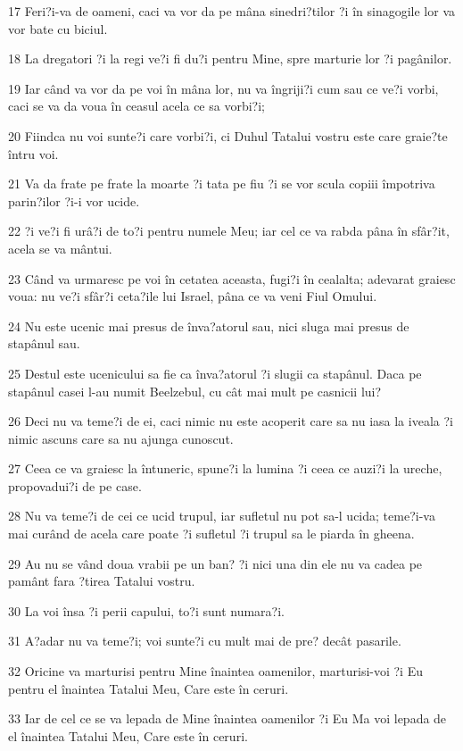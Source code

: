 \par 17 Feri?i-va de oameni, caci va vor da pe mâna sinedri?tilor ?i în sinagogile lor va vor bate cu biciul.
\par 18 La dregatori ?i la regi ve?i fi du?i pentru Mine, spre marturie lor ?i pagânilor.
\par 19 Iar când va vor da pe voi în mâna lor, nu va îngriji?i cum sau ce ve?i vorbi, caci se va da voua în ceasul acela ce sa vorbi?i;
\par 20 Fiindca nu voi sunte?i care vorbi?i, ci Duhul Tatalui vostru este care graie?te întru voi.
\par 21 Va da frate pe frate la moarte ?i tata pe fiu ?i se vor scula copiii împotriva parin?ilor ?i-i vor ucide.
\par 22 ?i ve?i fi urâ?i de to?i pentru numele Meu; iar cel ce va rabda pâna în sfâr?it, acela se va mântui.
\par 23 Când va urmaresc pe voi în cetatea aceasta, fugi?i în cealalta; adevarat graiesc voua: nu ve?i sfâr?i ceta?ile lui Israel, pâna ce va veni Fiul Omului.
\par 24 Nu este ucenic mai presus de înva?atorul sau, nici sluga mai presus de stapânul sau.
\par 25 Destul este ucenicului sa fie ca înva?atorul ?i slugii ca stapânul. Daca pe stapânul casei l-au numit Beelzebul, cu cât mai mult pe casnicii lui?
\par 26 Deci nu va teme?i de ei, caci nimic nu este acoperit care sa nu iasa la iveala ?i nimic ascuns care sa nu ajunga cunoscut.
\par 27 Ceea ce va graiesc la întuneric, spune?i la lumina ?i ceea ce auzi?i la ureche, propovadui?i de pe case.
\par 28 Nu va teme?i de cei ce ucid trupul, iar sufletul nu pot sa-l ucida; teme?i-va mai curând de acela care poate ?i sufletul ?i trupul sa le piarda în gheena.
\par 29 Au nu se vând doua vrabii pe un ban? ?i nici una din ele nu va cadea pe pamânt fara ?tirea Tatalui vostru.
\par 30 La voi însa ?i perii capului, to?i sunt numara?i.
\par 31 A?adar nu va teme?i; voi sunte?i cu mult mai de pre? decât pasarile.
\par 32 Oricine va marturisi pentru Mine înaintea oamenilor, marturisi-voi ?i Eu pentru el înaintea Tatalui Meu, Care este în ceruri.
\par 33 Iar de cel ce se va lepada de Mine înaintea oamenilor ?i Eu Ma voi lepada de el înaintea Tatalui Meu, Care este în ceruri.
